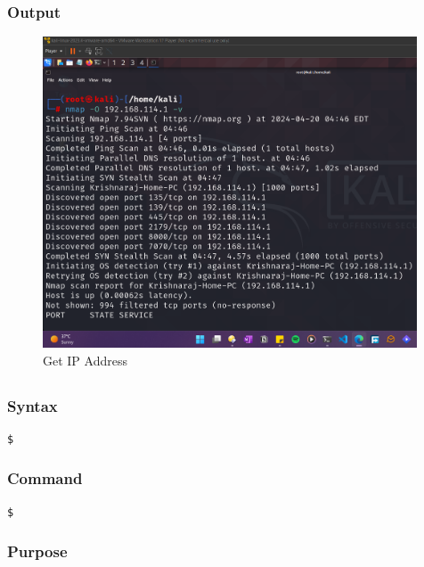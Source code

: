 \documentclass[11pt]{article}
\begin{document}
\subsubsection*{Output}
\begin{figure}[H]
    \centering
    \includegraphics[width=0.99\textwidth]{a3_ss (1).png}
    \caption{Get IP Address}
    \label{fig:1}
\end{figure}
\subsection{}

\subsubsection*{Syntax}
\begin{verbatim}
$
\end{verbatim}

\subsubsection*{Command}
\begin{verbatim}
$
\end{verbatim}

\subsubsection*{Purpose}
\end{document}
